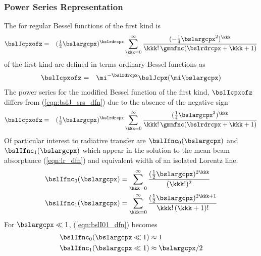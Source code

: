 \documentclass[12pt]{article}
\begin{document}
\subsubsection[Power Series Representation]{Power Series Representation}\label{sxn:bsl_pwr}
The  for regular Bessel functions of the first
kind is 
\begin{eqnarray}
\bslJcpxofz & = & 
({\tfrac{1}{2}}\bslargcpx)^{\bslrdrcpx} \sum_{\kkk=0}^{\infty}
\frac{(-\frac{1}{4}\bslargcpx^{2})^{\kkk}}{\kkk!\, 
\gmmfnc(\bslrdrcpx + \kkk + 1)}
\label{eqn:bslJ_srs_dfn}
\end{eqnarray}
 of the 
first kind are defined in terms ordinary Bessel functions as
\begin{eqnarray}
\bslIcpxofz & = & \mi^{-\bslrdrcpx} \bslJcpx(\mi\bslargcpx)
\label{eqn:bslI_dfn}
\end{eqnarray}
The power series for the modified Bessel function of the first kind,
$\bslIcpxofz$ differs from (\ref{eqn:bslJ_srs_dfn}) due to the absence
of the negative sign
\begin{eqnarray}
\bslIcpxofz & = & 
({\textstyle\frac{1}{2}}\bslargcpx)^{\bslrdrcpx} \sum_{\kkk=0}^{\infty}
\frac{(\frac{1}{4}\bslargcpx^{2})^{\kkk}}{\kkk!\, \gmmfnc(\bslrdrcpx + \kkk + 1)}
\label{eqn:bslI_srs_dfn}
\end{eqnarray}
Of particular interest to radiative transfer are $\bslIfnc_{0}(\bslargcpx)$ 
and  $\bslIfnc_{1}(\bslargcpx)$ which appear in the solution to the
mean beam absorptance (\ref{eqn:lr_dfn}) and equivalent width of an
isolated Lorentz line.
\begin{subequations}
\label{eqn:bslI01_dfn}
\begin{align}
\label{eqn:bslI0_dfn}
\bslIfnc_{0}(\bslargcpx) & = 
\sum_{\kkk=0}^{\infty}
\frac{({\textstyle\frac{1}{2}}\bslargcpx)^{2\kkk}}{(\kkk!)^{2}} \\
\label{eqn:bslI1_dfn}
\bslIfnc_{1}(\bslargcpx) & = 
\sum_{\kkk=0}^{\infty}
\frac{({\textstyle\frac{1}{2}}\bslargcpx)^{2\kkk+1}}{\kkk!\,(\kkk+1)!}
\end{align}
\end{subequations}
For $\bslargcpx \ll 1$, (\ref{eqn:bslI01_dfn}) becomes
\begin{subequations}
\label{eqn:bslI01_lmt_dfn}
\begin{align}
\bslIfnc_{0}(\bslargcpx \ll 1) & \approx 1 \\
\bslIfnc_{1}(\bslargcpx \ll 1) & \approx \bslargcpx/2
\end{align}
\end{subequations}
\end{document}
